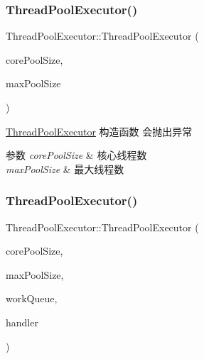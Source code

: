 \subsubsection{\texorpdfstring{Thread\+Pool\+Executor()}{ThreadPoolExecutor()}\hspace{0.1cm}{\footnotesize\ttfamily [2/3]}}
{\footnotesize\ttfamily Thread\+Pool\+Executor\+::\+Thread\+Pool\+Executor (\begin{DoxyParamCaption}\item[{int32\+\_\+t}]{core\+Pool\+Size,  }\item[{int32\+\_\+t}]{max\+Pool\+Size }\end{DoxyParamCaption})\hspace{0.3cm}{\ttfamily [explicit]}}



\hyperlink{classThreadPoolExecutor}{Thread\+Pool\+Executor} 构造函数 会抛出异常 


\begin{DoxyParams}{参数}
{\em core\+Pool\+Size} & 核心线程数 \\
\hline
{\em max\+Pool\+Size} & 最大线程数 \\
\hline
\end{DoxyParams}
\mbox{\label{classThreadPoolExecutor_ace4ccc92f13fdeed49fb5e6efb7ee233}} 
\subsubsection{\texorpdfstring{Thread\+Pool\+Executor()}{ThreadPoolExecutor()}\hspace{0.1cm}{\footnotesize\ttfamily [3/3]}}
{\footnotesize\ttfamily Thread\+Pool\+Executor\+::\+Thread\+Pool\+Executor (\begin{DoxyParamCaption}\item[{int32\+\_\+t}]{core\+Pool\+Size,  }\item[{int32\+\_\+t}]{max\+Pool\+Size,  }\item[{\hyperlink{classBlockingQueue}{Blocking\+Queue}$<$ \hyperlink{classRunnable}{Runnable} $>$ $\ast$}]{work\+Queue,  }\item[{\hyperlink{classRejectedExecutionHandler}{Rejected\+Execution\+Handler} $\ast$}]{handler }\end{DoxyParamCaption})\hspace{0.3cm}{\ttfamily [explicit]}}



